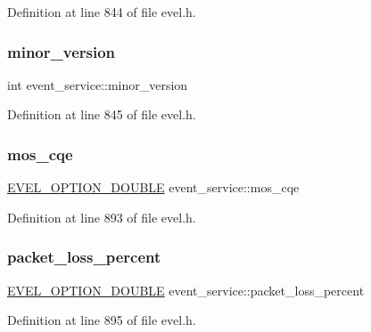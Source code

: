 Definition at line 844 of file evel.\+h.

\hypertarget{structevent__service_a9376bab79a517d8ae680e2219f94a864}{}\label{structevent__service_a9376bab79a517d8ae680e2219f94a864} 
\subsubsection{\texorpdfstring{minor\+\_\+version}{minor\_version}}
{\footnotesize\ttfamily int event\+\_\+service\+::minor\+\_\+version}



Definition at line 845 of file evel.\+h.

\hypertarget{structevent__service_a8bf0cb24c4e5b5a8ff44e1954780776c}{}\label{structevent__service_a8bf0cb24c4e5b5a8ff44e1954780776c} 
\subsubsection{\texorpdfstring{mos\+\_\+cqe}{mos\_cqe}}
{\footnotesize\ttfamily \hyperlink{evel_8h_aafc42b3cd9aca88804c3d413e4ccec06}{E\+V\+E\+L\+\_\+\+O\+P\+T\+I\+O\+N\+\_\+\+D\+O\+U\+B\+LE} event\+\_\+service\+::mos\+\_\+cqe}



Definition at line 893 of file evel.\+h.

\hypertarget{structevent__service_abc563b92046f42cf2cffbb3c6aac195f}{}\label{structevent__service_abc563b92046f42cf2cffbb3c6aac195f} 
\subsubsection{\texorpdfstring{packet\+\_\+loss\+\_\+percent}{packet\_loss\_percent}}
{\footnotesize\ttfamily \hyperlink{evel_8h_aafc42b3cd9aca88804c3d413e4ccec06}{E\+V\+E\+L\+\_\+\+O\+P\+T\+I\+O\+N\+\_\+\+D\+O\+U\+B\+LE} event\+\_\+service\+::packet\+\_\+loss\+\_\+percent}



Definition at line 895 of file evel.\+h.

